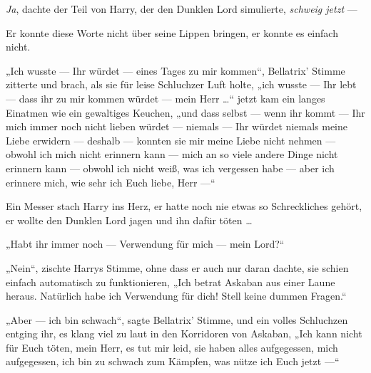 \emph{Ja}, dachte der Teil von Harry, der den Dunklen Lord simulierte, \emph{schweig jetzt} —

Er konnte diese Worte nicht über seine Lippen bringen, er konnte es einfach nicht.

„Ich wusste — Ihr würdet — eines Tages zu mir kommen“, Bellatrix’ Stimme zitterte und brach, als sie für leise Schluchzer Luft holte, „ich wusste — Ihr lebt — dass ihr zu mir kommen würdet — mein Herr …“ jetzt kam ein langes Einatmen wie ein gewaltiges Keuchen, „und dass selbst — wenn ihr kommt — Ihr mich immer noch nicht lieben würdet — niemals — Ihr würdet niemals meine Liebe erwidern — deshalb — konnten sie mir meine Liebe nicht nehmen — obwohl ich mich nicht erinnern kann — mich an so viele andere Dinge nicht erinnern kann — obwohl ich nicht weiß, was ich vergessen habe — aber ich erinnere mich, wie sehr ich Euch liebe, Herr —“

Ein Messer stach Harry ins Herz, er hatte noch nie etwas so Schreckliches gehört, er wollte den Dunklen Lord jagen und ihn dafür töten …

„Habt ihr immer noch — Verwendung für mich — mein Lord?“

„Nein“, zischte Harrys Stimme, ohne dass er auch nur daran dachte, sie schien einfach automatisch zu funktionieren,
„Ich betrat Askaban aus einer Laune heraus. Natürlich habe ich Verwendung für dich! Stell keine dummen Fragen.“

„Aber — ich bin schwach“, sagte Bellatrix’ Stimme, und ein volles Schluchzen entging ihr, es klang viel zu laut in den Korridoren von Askaban,
„Ich kann nicht für Euch töten, mein Herr, es tut mir leid, sie haben alles aufgegessen, mich aufgegessen, ich bin zu schwach zum Kämpfen, was nütze ich Euch jetzt —“

